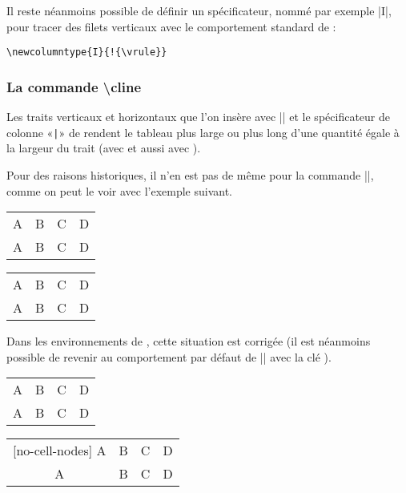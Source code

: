 \documentclass[dvipsnames]{article}%
\begin{document}
\medskip
Il reste néanmoins possible de définir un spécificateur, nommé par exemple
|I|, pour tracer des filets verticaux avec le comportement standard de
 :
%
\begin{Verbatim}
\newcolumntype{I}{!{\vrule}}
\end{Verbatim}




\subsubsection{La commande  \textbackslash cline}

\label{remark-cline}

Les traits verticaux et horizontaux que l'on insère avec |\hline| et le
spécificateur de colonne «\verb+|+» de  rendent le tableau plus large
ou plus long d'une quantité égale à la largeur du trait (avec  et
aussi avec ).

\smallskip
Pour des raisons historiques, il n'en est pas de même pour la commande |\cline|,
comme on peut le voir avec l'exemple suivant.

\medskip
\begin{Code}[width=10cm]
\setlength{\arrayrulewidth}{2pt}
\begin{tabular}{cccc} \hline
A&B&C&D \\ \emph{\cline{2-2}}
A&B&C&D \\ \hline
\end{tabular}
\end{Code}
%
\begin{scope}
\setlength{\arrayrulewidth}{2pt}
\begin{tabular}[c]{cccc}
\hline
A&B&C&D \\
\cline{2-2}
A&B&C&D \\
\hline
\end{tabular}
\end{scope}

\medskip
{}
Dans les environnements de , cette situation est corrigée (il
est néanmoins possible de revenir au comportement par défaut de |\cline| avec la
clé ).

\medskip
\begin{Code}[width=10cm]
\setlength{\arrayrulewidth}{2pt}
\begin{NiceTabular}{cccc} \hline
A&B&C&D \\ \emph{}
A&B&C&D \\ \hline
\end{NiceTabular}
\end{Code}
%
\begin{scope}
\setlength{\arrayrulewidth}{2pt}
\begin{NiceTabular}[c]{cccc}[no-cell-nodes]
\hline
A&B&C&D \\
A&B&C&D \\
\hline
\end{NiceTabular}
\end{scope}
\end{document}
